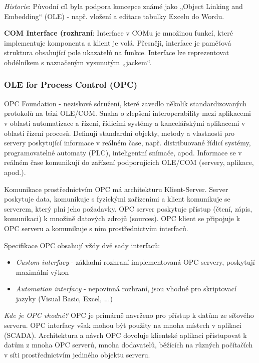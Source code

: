 \textit{Historie}: Původní cíl byla podpora koncepce známé jako „Object Linking and Embedding“ (OLE) - např. vložení a editace tabulky Excelu do Wordu.

\textbf{COM Interface (rozhraní}: Interface v COMu je množinou funkcí, které implementuje komponenta a klient je volá. Přesněji, interface je paměťová struktura obsahující pole ukazatelů na funkce. Interface lze reprezentovat obdélníkem s naznačeným vysunutým „jackem“.

\subsubsection*{OLE for Process Control (OPC)}
OPC Foundation - neziskové sdružení, které zavedlo několik standardizovaných protokolů na bázi OLE/COM. Snaha o zlepšení interoperability mezi aplikacemi v oblasti automatizace a řízení, řídicími systémy a kancelářskými aplikacemi v oblasti řízení procesů. Definují standardní objekty, metody a vlastnosti pro servery poskytující informace v reálném čase, např. distribuované řídicí systémy, programovatelné automaty (PLC), inteligentní snímače, apod. Informace se v reálném čase komunikují do zařízení podporujících OLE/COM (servery, aplikace, apod.).

Komunikace prostřednictvím OPC má architekturu Klient-Server. Server poskytuje data, komunikuje s fyzickými zařízeními a klient komunikuje se serverem, který plní jeho požadavky. OPC server poskytuje přístup (čtení, zápis, komunikaci) k množině datových zdrojů (sources). OPC klient se připojuje k OPC serveru a komunikuje s ním prostřednictvím interfaců.

Specifikace OPC obsahují vždy dvě sady interfaců:
\begin{itemize}
\item \textit{Custom interfacy} - základní rozhraní implementovaná OPC servery, poskytují maximální výkon
\item \textit{Automation interfacy} - nepovinná rozhraní, jsou vhodné pro skriptovací jazyky (Visual Basic, Excel, ...)
\end{itemize}
\textit{Kde je OPC vhodné?} OPC je primárně navrženo pro přístup k datům ze síťového serveru. OPC interfacy však mohou být použity na mnoha místech v aplikaci (SCADA). Architektura a návrh OPC dovoluje klientské aplikaci přistupovat k datům z mnoha OPC serverů, mnoha dodavatelů, běžících na různých počítačích v síti prostřednictvím jediného objektu serveru.

